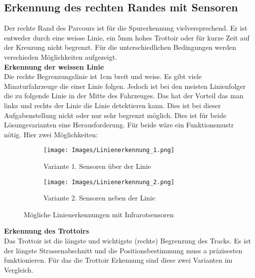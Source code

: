
\subsection{Erkennung des rechten Randes mit Sensoren}
Der rechte Rand des Parcours ist für die Spurerkennung vielversprechend. Er ist entweder durch eine weisse Linie, ein 5mm hohes Trottoir oder für kurze Zeit auf der Kreuzung nicht begrenzt.
Für die unterschiedlichen Bedingungen werden verschieden Möglichkeiten aufgezeigt.\\

\textbf {Erkennung der weissen Linie} \\
Die rechte Begrenzungslinie ist 1cm breit und weiss. Es gibt viele Minaturfahrzeuge die einer Linie folgen. Jedoch ist bei den meisten Linienfolger die zu folgende Linie in der Mitte des Fahrzeuges. Das hat der Vorteil das man links und rechts der Linie die Linie detektieren kann. Dies ist bei dieser Aufgabenstellung nicht oder nur sehr begrenzt möglich. Dies ist für beide Lösungsvarianten eine Herausforderung. Für beide wäre ein Funktionsmustr nötig.
Hier zwei Möglichkeiten:

\begin{figure} [hbp]
	\centering
	\begin{subfigure}[b]{0.4\textwidth}
		\texttt{[image: Images/Linienerkennung\_1.png]}
		\caption{Variante 1. Sensoren über der Linie}
	\end{subfigure}
	\hfill
	\begin{subfigure}[b]{0.42\textwidth}
		\texttt{[image: Images/Linienerkennung\_2.png]}
		\caption{Variante 2. Sensoren neben der Linie}
\end{subfigure}
	\caption{Mögliche Linienerkennungen mit Infrarotsensoren}\label{fig:animals}
\end{figure}


\textbf {Erkennung des Trottoirs} \\
Das Trottoir ist die längste und wichtigste (rechte) Begrenzung des Tracks. Es ist der längste Strassenabschnitt und die Positionsbestimmung muss a präzisesten funktionieren. Für das die Trottoir Erkennung sind diese zwei Varianten im Vergleich.
 
